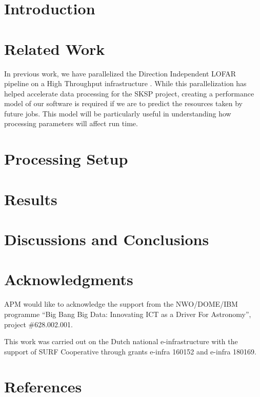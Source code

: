 \documentclass[preprint,5p]{elsarticle}
\begin{document}
\section{\label{sec:intro}Introduction }



\section{Related Work}\label{sec:related}
In previous work, we have parallelized the Direction Independent LOFAR pipeline on a High Throughput infrastructure \citep{mechev17}. While this parallelization has helped accelerate data processing for the SKSP project, creating a performance model of our software is required if we are to predict the resources taken by future jobs. This model will be particularly useful in understanding how processing parameters will affect run time.  


\section{Processing Setup }\label{sec:methods}



\section{Results}\label{sec:results}



\section{Discussions and Conclusions}\label{sec:discussions}





\section*{Acknowledgments}
APM would like to acknowledge the support from the NWO/DOME/IBM programme ``Big Bang Big Data: Innovating ICT as a Driver For Astronomy'', project \#628.002.001.

This work was carried out on the Dutch national e-infrastructure with the support of SURF
Cooperative through grants e-infra 160152 and e-infra 180169.

\section*{References}

\end{document}

